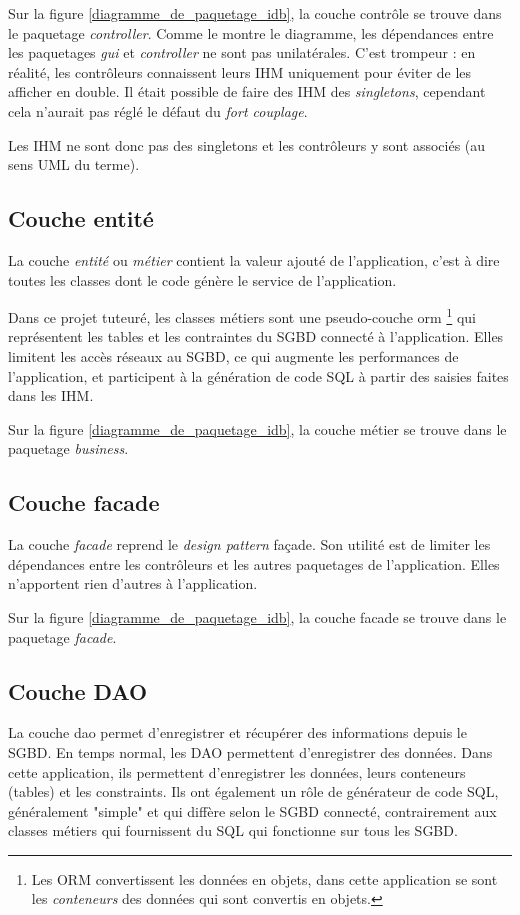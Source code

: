 Sur la figure \ref{diagramme_de_paquetage_idb}, la couche contrôle se trouve dans le paquetage \textit{controller}.
Comme le montre le diagramme, les dépendances entre les paquetages \textit{gui} et \textit{controller} ne sont pas unilatérales.
C'est trompeur : en réalité, les contrôleurs connaissent leurs IHM uniquement pour éviter de les afficher en double.
Il était possible de faire des IHM des \textit{singletons}, cependant cela n'aurait pas réglé le défaut du \textit{fort couplage}.

Les IHM ne sont donc pas des singletons et les contrôleurs y sont associés (au sens UML du terme).

\subsection{Couche entité}
La couche \textit{entité} ou \textit{métier} contient la valeur ajouté de l'application, c'est à dire toutes les classes dont le code génère le service de l'application.

Dans ce projet tuteuré, les classes métiers sont une pseudo-couche \gls{orm}
\footnote{\label{faux_orm}Les ORM convertissent les données en objets, dans cette application se sont les \textit{conteneurs} des données qui sont convertis en objets.}
qui représentent les tables et les contraintes du SGBD connecté à l'application.
Elles limitent les accès réseaux au SGBD, ce qui augmente les performances de l'application, et participent à la génération de code SQL à partir des saisies faites dans les IHM.

Sur la figure \ref{diagramme_de_paquetage_idb}, la couche métier se trouve dans le paquetage \textit{business}.

\subsection{Couche facade}
La couche \textit{facade} reprend le \textit{design pattern} façade.
Son utilité est de limiter les dépendances entre les contrôleurs et les autres paquetages de l'application.
Elles n'apportent rien d'autres à l'application.

Sur la figure \ref{diagramme_de_paquetage_idb}, la couche facade se trouve dans le paquetage \textit{facade}.

\subsection{Couche DAO}
La couche \gls{dao} permet d'enregistrer et récupérer des informations depuis le SGBD.
En temps normal, les DAO permettent d'enregistrer des données.
Dans cette application, ils permettent d'enregistrer les données, leurs conteneurs (tables) et les \glspl{constraint}.
Ils ont également un rôle de générateur de code SQL, généralement "simple" et qui diffère selon le SGBD connecté, contrairement aux classes métiers qui fournissent du SQL qui fonctionne sur tous les SGBD.

